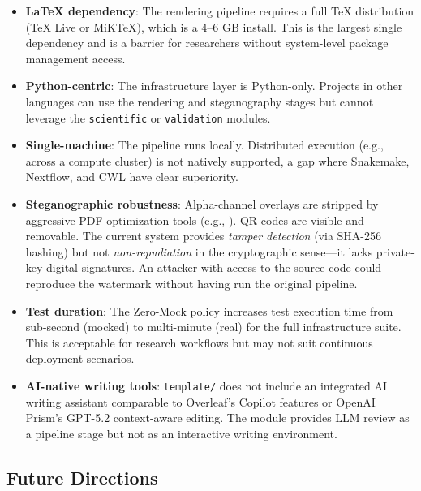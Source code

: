 \documentclass[
  english,
]{article}
\providecommand{\tightlist}{%
  \setlength{\itemsep}{0pt}\setlength{\parskip}{0pt}}
\begin{document}
\begin{itemize}
\tightlist
\item
  \textbf{LaTeX dependency}: The rendering pipeline requires a full TeX
  distribution (TeX Live or MiKTeX), which is a 4--6 GB install. This is
  the largest single dependency and is a barrier for researchers without
  system-level package management access.
\item
  \textbf{Python-centric}: The infrastructure layer is Python-only.
  Projects in other languages can use the rendering and steganography
  stages but cannot leverage the \texttt{scientific} or
  \texttt{validation} modules.
\item
  \textbf{Single-machine}: The pipeline runs locally. Distributed
  execution (e.g., across a compute cluster) is not natively supported,
  a gap where Snakemake, Nextflow, and CWL have clear superiority.
\item
  \textbf{Steganographic robustness}: Alpha-channel overlays are
  stripped by aggressive PDF optimization tools (e.g.,
  ). QR codes are visible and removable. The
  current system provides \emph{tamper detection} (via SHA-256 hashing)
  but not \emph{non-repudiation} in the cryptographic sense---it lacks
  private-key digital signatures. An attacker with access to the source
  code could reproduce the watermark without having run the original
  pipeline.
\item
  \textbf{Test duration}: The Zero-Mock policy increases test execution
  time from sub-second (mocked) to multi-minute (real) for the full
  infrastructure suite. This is acceptable for research workflows but
  may not suit continuous deployment scenarios.
\item
  \textbf{AI-native writing tools}: \texttt{template/} does not include
  an integrated AI writing assistant comparable to Overleaf's Copilot
  features or OpenAI Prism's GPT-5.2 context-aware editing. The
   module provides LLM review as a pipeline
  stage but not as an interactive writing environment.
\end{itemize}

\newpage

\subsection{Future Directions}\label{future-directions}
\end{document}
